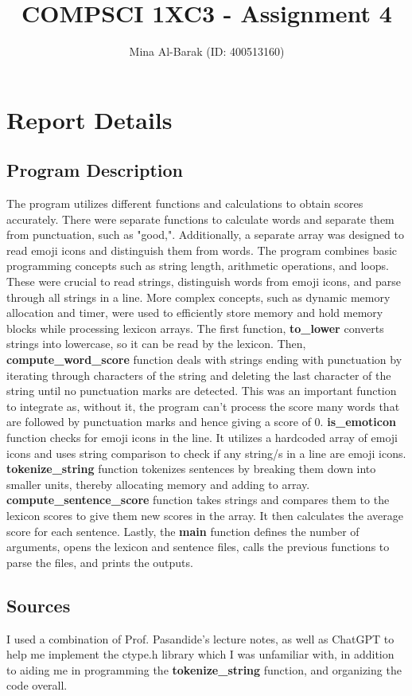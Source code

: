 \documentclass{report}
\title{COMPSCI 1XC3 - Assignment 4}
\author{Mina Al-Barak (ID: 400513160)}
\begin{document}
\maketitle

\chapter{Report Details}
\section{Program Description}
The program utilizes different functions and calculations to obtain scores accurately. There were separate functions to calculate words and separate them from punctuation, such as "good,". Additionally, a separate array was designed to read emoji icons and distinguish them from words. The program combines basic programming concepts such as string length, arithmetic operations, and loops. These were crucial to read strings, distinguish words from emoji icons, and parse through all strings in a line. More complex concepts, such as dynamic memory allocation and timer, were used to efficiently store memory and hold memory blocks while processing lexicon arrays. 
The first function, \textbf{to\_lower} converts strings into lowercase, so it can be read by the lexicon. Then, \textbf{compute\_word\_score} function deals with strings ending with punctuation by iterating through characters of the string and deleting the last character of the string until no punctuation marks are detected. This was an important function to integrate as, without it, the program can't process the score many words that are followed by punctuation marks and hence giving a score of 0. \textbf{is\_emoticon} function checks for emoji icons in the line. It utilizes a hardcoded array of emoji icons and uses string comparison to check if any string/s in a line are emoji icons. \textbf{tokenize\_string} function tokenizes sentences by breaking them down into smaller units, thereby allocating memory and adding to array. \textbf{compute\_sentence\_score} function takes strings and compares them to the lexicon scores to give them new scores in the array. It then calculates the average score for each sentence. Lastly, the \textbf{main} function defines the number of arguments, opens the lexicon and sentence files, calls the previous functions to parse the files, and prints the outputs. 

\section{Sources}
I used a combination of Prof. Pasandide's lecture notes, as well as ChatGPT to help me implement the ctype.h library which I was unfamiliar with, in addition to aiding me in programming the \textbf{tokenize\_string} function, and organizing the code overall. 
\end{document}
